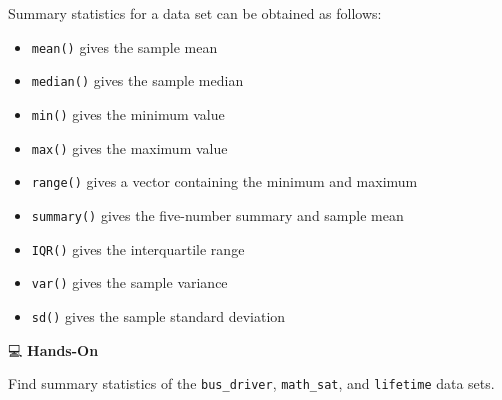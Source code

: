 \documentclass[
  letterpaper,
  DIV=11,
  numbers=noendperiod]{scrreprt}
\begin{document}
Summary statistics for a data set can be obtained as follows:

\begin{itemize}
\item
  \texttt{mean()} gives the sample mean
\item
  \texttt{median()} gives the sample median
\item
  \texttt{min()} gives the minimum value
\item
  \texttt{max()} gives the maximum value
\item
  \texttt{range()} gives a vector containing the minimum and maximum
\item
  \texttt{summary()} gives the five-number summary and sample mean
\item
  \texttt{IQR()} gives the interquartile range
\item
  \texttt{var()} gives the sample variance
\item
  \texttt{sd()} gives the sample standard deviation
\end{itemize}

💻 \textbf{Hands-On}

Find summary statistics of the \texttt{bus\_driver}, \texttt{math\_sat},
and \texttt{lifetime} data sets.
\end{document}
